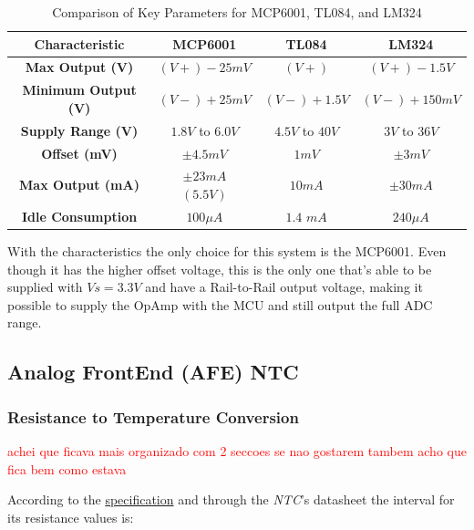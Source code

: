\documentclass[12pt]{article}
\begin{document}
    \begin{table}[h]            
        \centering
        \begin{tabular}{|c|c|c|c|}
        \hline
        \textbf{Characteristic}         & \textbf{MCP6001}      & \textbf{TL084}   & \textbf{LM324}  \\ \hline
        \textbf{Max Output (V)}         &$(V+)-25mV$            & $(V+)$           & $(V+) - 1.5V$   \\ \hline
        \textbf{Minimum Output (V)}     &$(V-)+25mV$            & $(V-) + 1.5V$   & $(V-) + 150mV$  \\ \hline
        \textbf{Supply Range (V)}       & $1.8V$ to $6.0V$      & $4.5V$ to $40V$  & $3V$ to $36V$   \\ \hline
        \textbf{Offset (mV)}            & $\pm 4.5mV$             & $1mV$              & $\pm 3 mV$      \\ \hline
        \textbf{Max Output (mA)}        & $\pm 23 mA$ $(5.5V)$  & $10 mA$          & $\pm 30 mA$     \\ \hline
        \textbf{Idle Consumption}       & $100 \mu A $          & $1.4$ $mA$       & $240 \mu A$      \\ \hline
        \end{tabular}
        \caption{Comparison of Key Parameters for MCP6001, TL084, and LM324}
    \end{table}

    With the characteristics the only choice for this system is the MCP6001. Even though it has the higher offset voltage, this is the only one that's able to be supplied with $Vs=3.3V$ and have a Rail-to-Rail output voltage, making it possible to supply the OpAmp with the MCU and still output the full ADC range.


\subsection{Analog FrontEnd (AFE) NTC}
\label{AFENTC}

    \subsubsection{ Resistance to Temperature Conversion }

    \textcolor{red}{ achei que ficava mais organizado com 2 seccoes se nao gostarem tambem acho que fica bem como estava }

    According to the \hyperref[requirements]{specification} and through the \textit{NTC}'s datasheet the interval for its resistance values is:
    
\end{document}
